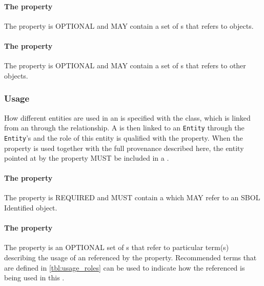 \paragraph{The  property}\label{sec:usages}
The  property is OPTIONAL and MAY contain a set of s that refers to  objects.

\paragraph{The  property}\label{sec:wasInformedBys}
The  property is OPTIONAL and MAY contain a set of s that refers to other  objects.

\subsubsection{Usage}
\label{sec:Usage}
How different entities are used in an  is specified with the  class, which is linked from an  through the  relationship. A  is then linked to an \texttt{Entity} through the \texttt{Entity}'s  and the role of this entity is qualified with the  property. When the  property is used together with the full provenance described here, the entity pointed at by the  property MUST be included in a .

\paragraph{The  property}\label{sec:entity}
The  property is REQUIRED and MUST contain a  which MAY refer to an SBOL Identified object.

\paragraph{The  property}\label{sec:roles:U}
The  property is an OPTIONAL set of s that refer to particular term(s) describing the usage of an  referenced by the  property. Recommended terms that are defined in \ref{tbl:usage_roles} can be used to indicate how the referenced  is being used in this .

